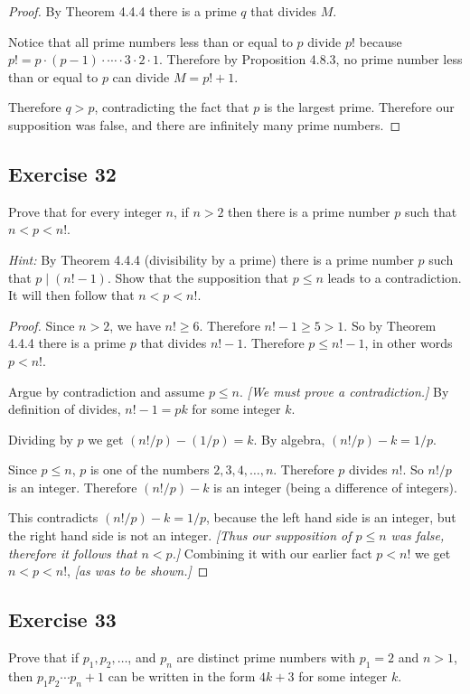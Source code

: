 \documentclass[14pt]{extarticle}
\begin{document}
\begin{proof}
    By Theorem 4.4.4 there is a prime $q$ that divides $M$.

    Notice that all prime numbers less than or equal to $p$ divide $p!$ because $p! = p \cdot (p-1) \cdot \cdots \cdot 3 \cdot 2 \cdot 1$. Therefore by Proposition 4.8.3, no prime number less than or equal to $p$ can divide $M = p!+1$.

    Therefore $q > p$, contradicting the fact that $p$ is the largest prime. Therefore our supposition was false, and there are infinitely many prime numbers.
\end{proof}

\subsection{Exercise 32}
Prove that for every integer $n$, if $n > 2$ then there is a prime number $p$ such that $n < p < n!$.

    {\it Hint:} By Theorem 4.4.4 (divisibility by a prime) there is a prime number $p$ such that $p \mid (n! - 1)$. Show that the supposition that $p \leq n$ leads to a contradiction. It will then follow that $n < p < n!$.

\begin{proof}
    Since $n > 2$, we have $n! \geq 6$. Therefore $n! - 1 \geq 5 > 1$. So by Theorem 4.4.4 there is a prime $p$ that divides $n!-1$. Therefore $p \leq n!-1$, in other words $p < n!$.

    Argue by contradiction and assume $p \leq n$. {\it [We must prove a contradiction.]} By definition of divides, $n!-1 = pk$ for some integer $k$.

    Dividing by $p$ we get $(n!/p) - (1/p) = k$. By algebra, $(n!/p) - k = 1/p$.

    Since $p \leq n$, $p$ is one of the numbers $2, 3, 4, \ldots, n$. Therefore $p$ divides $n!$. So $n! / p$ is an integer. Therefore $(n!/p) - k$ is an integer (being a difference of integers).

    This contradicts $(n!/p) - k = 1/p$, because the left hand side is an integer, but the right hand side is not an integer. {\it [Thus our supposition of $p \leq n$ was false, therefore it follows that $n < p$.]} Combining it with our earlier fact $p < n!$ we get $n < p < n!$, {\it [as was to be shown.]}
\end{proof}

\subsection{Exercise 33}
Prove that if $p_1, p_2, \ldots$, and $p_n$ are distinct prime numbers with $p_1 = 2$ and $n > 1$, then $p_1 p_2 \cdots p_n + 1$ can be written in the form $4k + 3$ for some integer $k$.
\end{document}
